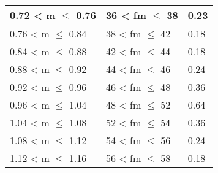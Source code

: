 \begin{appendix}
\begin{table}[ht!]
\begin{tabular}{|l|l|l|}
		0.72 < m $\leq$ 0.76                                                                            & 36 < fm $\leq$ 38                                                                                                    & 0.23                        \\ \hline
		0.76 < m $\leq$ 0.84                                                                            & 38 < fm $\leq$ 42                                                                                                    & 0.18                        \\ \hline
		0.84 < m $\leq$ 0.88                                                                            & 42 < fm $\leq$ 44                                                                                                    & 0.18                        \\ \hline
		0.88 < m $\leq$ 0.92                                                                            & 44 < fm $\leq$ 46                                                                                                    & 0.24                        \\ \hline
		0.92 < m $\leq$ 0.96                                                                            & 46 < fm $\leq$ 48                                                                                                    & 0.36                        \\ \hline
		0.96 < m $\leq$ 1.04                                                                            & 48 < fm $\leq$ 52                                                                                                    & 0.64                        \\ \hline
		1.04 < m $\leq$ 1.08                                                                            & 52 < fm $\leq$ 54                                                                                                    & 0.36                        \\ \hline
		1.08 < m $\leq$ 1.12                                                                            & 54 < fm $\leq$ 56                                                                                                    & 0.24                        \\ \hline
		1.12 < m $\leq$ 1.16                                                                            & 56 < fm $\leq$ 58                                                                                                    & 0.18                        \\ \hline

\end{tabular}
\end{table}
\end{appendix}
